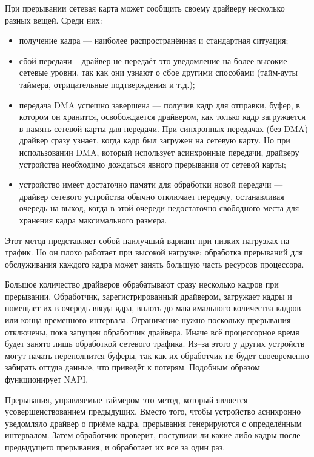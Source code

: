 При прерывании сетевая карта может сообщить своему драйверу несколько разных вещей. Среди них:
\begin{itemize}[label=---]
	\item получение кадра --- наиболее распространённая и стандартная ситуация;
	\item сбой передачи --  драйвер не передаёт это уведомление на более высокие сетевые уровни, так как они узнают о сбое другими способами (тайм-ауты таймера, отрицательные подтверждения и т.д.);
	\item передача DMA успешно завершена --- получив кадр для отправки, буфер, в котором он хранится, освобождается драйвером, как только кадр загружается в память сетевой карты для передачи. При синхронных передачах (без DMA) драйвер сразу узнает, когда кадр был загружен на сетевую карту. Но при использовании DMA, который использует асинхронные передачи, драйверу устройства необходимо дождаться явного прерывания от сетевой карты;
	\item устройство имеет достаточно памяти для обработки новой передачи --- драйвер сетевого устройства обычно отключает передачу, останавливая очередь на выход, когда в этой очереди недостаточно свободного места для хранения кадра максимального размера.
\end{itemize}

Этот метод представляет собой наилучший вариант при низких нагрузках на трафик. Но он плохо работает при высокой нагрузке: обработка прерываний для обслуживания каждого кадра может занять большую часть ресурсов процессора.

Большое количество драйверов обрабатывают сразу несколько кадров при прерывании. Обработчик, зарегистрированный драйвером, загружает кадры и помещает их в очередь ввода ядра, вплоть до максимального количества кадров или конца временного интервала. Ограничение нужно поскольку прерывания отключены, пока
запущен обработчик драйвера. Иначе всё процессорное время будет занято лишь обработкой сетевого трафика.  Из--за этого у других устройств могут начать переполнится буферы, так как их обработчик не будет своевременно забирать оттуда данные, что приведёт к потерям. Подобным образом функционирует NAPI.

Прерывания, управляемые таймером это метод, который является усовершенствованием предыдущих. Вместо того, чтобы устройство асинхронно уведомляло драйвер о приёме кадра, прерывания генерируются с определённым интервалом. Затем обработчик проверит, поступили ли какие-либо кадры после предыдущего прерывания, и обработает их все за один раз.

